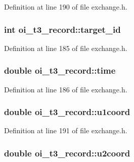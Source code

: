 Definition at line 190 of file exchange.h.

\hypertarget{structoi__t3__record_a1fc9b4818dd722a5584ed08cbfc479af}{
\subsubsection[{target\_\-id}]{\setlength{\rightskip}{0pt plus 5cm}int {\bf oi\_\-t3\_\-record::target\_\-id}}}
\label{structoi__t3__record_a1fc9b4818dd722a5584ed08cbfc479af}


Definition at line 185 of file exchange.h.

\hypertarget{structoi__t3__record_ab06b79d9fb8fb5dccf1cd1df16096834}{
\subsubsection[{time}]{\setlength{\rightskip}{0pt plus 5cm}double {\bf oi\_\-t3\_\-record::time}}}
\label{structoi__t3__record_ab06b79d9fb8fb5dccf1cd1df16096834}


Definition at line 186 of file exchange.h.

\hypertarget{structoi__t3__record_aa3c3264bedbd243687b4361bb6975c3a}{
\subsubsection[{u1coord}]{\setlength{\rightskip}{0pt plus 5cm}double {\bf oi\_\-t3\_\-record::u1coord}}}
\label{structoi__t3__record_aa3c3264bedbd243687b4361bb6975c3a}


Definition at line 191 of file exchange.h.

\hypertarget{structoi__t3__record_a0b231e7bf88856eb0957ff276fb11b2c}{
\subsubsection[{u2coord}]{\setlength{\rightskip}{0pt plus 5cm}double {\bf oi\_\-t3\_\-record::u2coord}}}
\label{structoi__t3__record_a0b231e7bf88856eb0957ff276fb11b2c}


